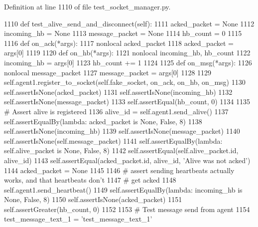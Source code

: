 Definition at line 1110 of file test\+\_\+socket\+\_\+manager.\+py.


\begin{DoxyCode}
1110     \textcolor{keyword}{def }test\_alive\_send\_and\_disconnect(self):
1111         acked\_packet = \textcolor{keywordtype}{None}
1112         incoming\_hb = \textcolor{keywordtype}{None}
1113         message\_packet = \textcolor{keywordtype}{None}
1114         hb\_count = 0
1115 
1116         \textcolor{keyword}{def }on\_ack(*args):
1117             nonlocal acked\_packet
1118             acked\_packet = args[0]
1119 
1120         \textcolor{keyword}{def }on\_hb(*args):
1121             nonlocal incoming\_hb, hb\_count
1122             incoming\_hb = args[0]
1123             hb\_count += 1
1124 
1125         \textcolor{keyword}{def }on\_msg(*args):
1126             nonlocal message\_packet
1127             message\_packet = args[0]
1128 
1129         self.agent1.register\_to\_socket(self.fake\_socket, on\_ack, on\_hb, on\_msg)
1130         self.assertIsNone(acked\_packet)
1131         self.assertIsNone(incoming\_hb)
1132         self.assertIsNone(message\_packet)
1133         self.assertEqual(hb\_count, 0)
1134 
1135         \textcolor{comment}{# Assert alive is registered}
1136         alive\_id = self.agent1.send\_alive()
1137         self.assertEqualBy(\textcolor{keyword}{lambda}: acked\_packet \textcolor{keywordflow}{is} \textcolor{keywordtype}{None}, \textcolor{keyword}{False}, 8)
1138         self.assertIsNone(incoming\_hb)
1139         self.assertIsNone(message\_packet)
1140         self.assertIsNone(self.message\_packet)
1141         self.assertEqualBy(\textcolor{keyword}{lambda}: self.alive\_packet \textcolor{keywordflow}{is} \textcolor{keywordtype}{None}, \textcolor{keyword}{False}, 8)
1142         self.assertEqual(self.alive\_packet.id, alive\_id)
1143         self.assertEqual(acked\_packet.id, alive\_id, \textcolor{stringliteral}{'Alive was not acked'})
1144         acked\_packet = \textcolor{keywordtype}{None}
1145 
1146         \textcolor{comment}{# assert sending heartbeats actually works, and that heartbeats don't}
1147         \textcolor{comment}{# get acked}
1148         self.agent1.send\_heartbeat()
1149         self.assertEqualBy(\textcolor{keyword}{lambda}: incoming\_hb \textcolor{keywordflow}{is} \textcolor{keywordtype}{None}, \textcolor{keyword}{False}, 8)
1150         self.assertIsNone(acked\_packet)
1151         self.assertGreater(hb\_count, 0)
1152 
1153         \textcolor{comment}{# Test message send from agent}
1154         test\_message\_text\_1 = \textcolor{stringliteral}{'test\_message\_text\_1'}

\end{DoxyCode}
